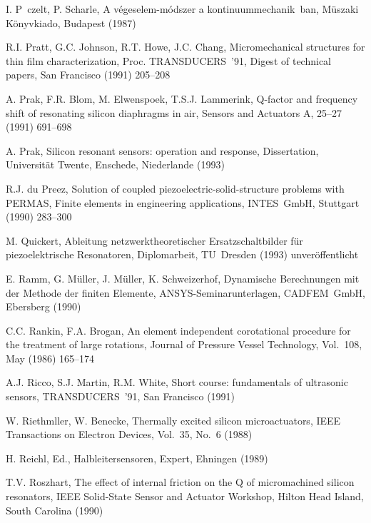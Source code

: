 \begin{thebibliography}{xxx}
 I. P czelt, P. Scharle, A végeselem-módszer a kontinuummechanik ban,
 Müszaki Könyvkiado, Budapest (1987)

 R.I. Pratt, G.C. Johnson, R.T. Howe, J.C. Chang, Micromechanical structures
 for thin film characterization, Proc. TRANSDUCERS~'91, Digest of technical
 papers, San Francisco (1991) 205--208

 A. Prak, F.R. Blom, M. Elwenspoek, T.S.J. Lammerink, Q-factor and frequency
 shift of resonating silicon diaphragms in air, Sensors and Actuators A,
 25--27 (1991) 691--698

 A. Prak, Silicon resonant sensors: operation and response, Dissertation,
 Universität Twente, Enschede, Niederlande (1993)

 R.J. du Preez, Solution of coupled piezoelectric-solid-structure problems
 with PERMAS, Finite elements in engineering applications, INTES~GmbH,
 Stuttgart (1990) 283--300

 M. Quickert, Ableitung netzwerktheoretischer Ersatzschaltbilder für
 piezoelektrische Resonatoren, Diplomarbeit, TU~Dresden (1993)
 unveröffentlicht

 E. Ramm, G. Müller, J. Müller, K. Schweizerhof,
 Dynamische Berechnungen mit der Methode der finiten Elemente,
 {\sf ANSYS}-Seminarunterlagen, CADFEM~GmbH, Ebersberg (1990)

 C.C. Rankin, F.A. Brogan, An element independent corotational procedure
 for the treatment of large rotations, Journal of Pressure Vessel Technology,
 Vol.~108, May (1986) 165--174

 A.J. Ricco, S.J. Martin, R.M. White, Short course: fundamentals of
 ultrasonic sensors, TRANSDUCERS~'91, San Francisco (1991)

 W. Riethmller, W. Benecke, Thermally excited silicon microactuators,
 IEEE Transactions on Electron Devices, Vol.~35, No.~6 (1988)

 H. Reichl, Ed., Halbleitersensoren, Expert, Ehningen (1989)

 T.V. Roszhart, The effect of internal friction on the Q of micromachined
 silicon resonators, IEEE Solid-State Sensor and Actuator Workshop,
 Hilton Head Island, South Carolina (1990)


\end{thebibliography}
